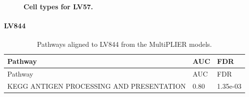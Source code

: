 \documentclass[
  a4paper,
]{article}
\newenvironment{fignos:tagged-figure}[1][]{
  \let\oldfigurename\figurename
  \renewcommand{\figurename}{Supplementary Figure}
}{
  \let\figurename\oldfigurename
}
\newenvironment{tablenos:tagged-table}[1][]{
  \let\oldtablename\tablename
  \renewcommand{\tablename}{Supplementary Table}
}{
  \let\tablename\oldtablename
}
\begin{document}
\begin{fignos:tagged-figure}[S21]

\begin{figure}
\hypertarget{fig:sup:lv57}{%
\centering

\caption{\textbf{Cell types for LV57.}}\label{fig:sup:lv57}
}
\end{figure}

\end{fignos:tagged-figure}

\clearpage

\hypertarget{lv844}{%
\paragraph{LV844}\label{lv844}}

\begin{tablenos:tagged-table}[S27]

\begin{longtable}[]{@{}lll@{}}
\caption{Pathways aligned to LV844 from the MultiPLIER models.
\label{tbl:sup:multiplier_pathways:lv844}}\label{tbl:sup:multiplier_pathways:lv844}\tabularnewline
\toprule()
Pathway & AUC & FDR \\
\midrule()
\endfirsthead
\toprule()
Pathway & AUC & FDR \\
\midrule()
\endhead
KEGG ANTIGEN PROCESSING AND PRESENTATION & 0.80 & 1.35e-03 \\
\bottomrule()
\end{longtable}

\end{tablenos:tagged-table}
\end{document}

